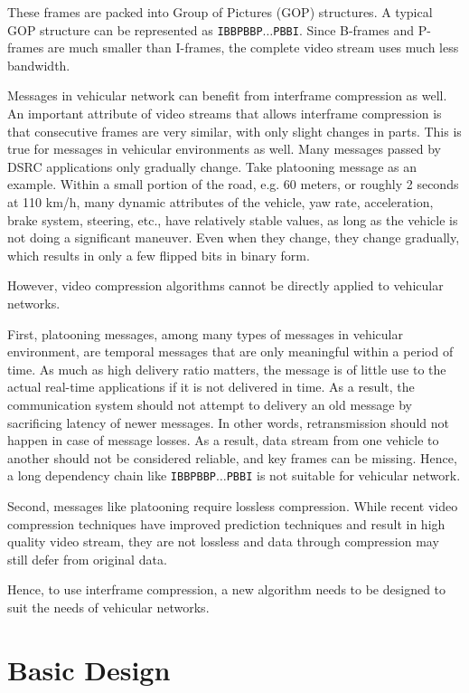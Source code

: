 \documentclass[12pt]{report}
\begin{document}
These frames are packed into Group of Pictures (GOP) structures. A typical GOP structure can be represented as \texttt{IBBPBBP$\ldots$PBBI}. Since B-frames and P-frames are much smaller than I-frames, the complete video stream uses much less bandwidth.

Messages in vehicular network can benefit from interframe compression as well. An important attribute of video streams that allows interframe compression is that consecutive frames are very similar, with only slight changes in parts. This is true for messages in vehicular environments as well. Many messages passed by DSRC applications only gradually change. Take platooning message as an example. Within a small portion of the road, e.g. 60 meters, or roughly 2 seconds at 110 km/h, many dynamic attributes of the vehicle, yaw rate, acceleration, brake system, steering, etc., have relatively stable values, as long as the vehicle is not doing a significant maneuver. Even when they change, they change gradually, which results in only a few flipped bits in binary form.

However, video compression algorithms cannot be directly applied to vehicular networks.

First, platooning messages, among many types of messages in vehicular environment, are temporal messages that are only meaningful within a period of time. As much as high delivery ratio matters, the message is of little use to the actual real-time applications if it is not delivered in time. As a result, the communication system should not attempt to delivery an old message by sacrificing latency of newer messages. In other words, retransmission should not happen in case of message losses. As a result, data stream from one vehicle to another should not be considered reliable, and key frames can be missing. Hence, a long dependency chain like \texttt{IBBPBBP$\ldots$PBBI} is not suitable for vehicular network.

Second, messages like platooning require lossless compression. While recent video compression techniques have improved prediction techniques and result in high quality video stream, they are not lossless and data through compression may still defer from original data.

Hence, to use interframe compression, a new algorithm needs to be designed to suit the needs of vehicular networks.

\section{Basic Design}
\end{document}

